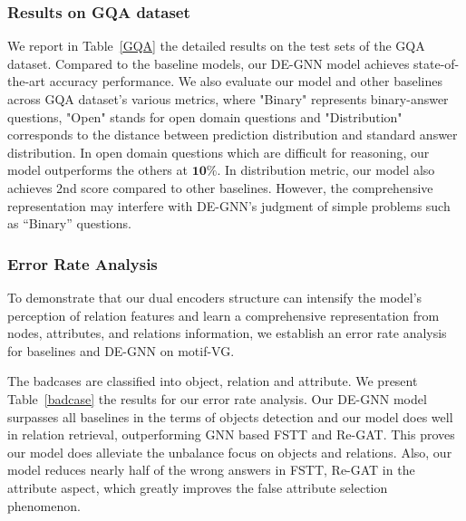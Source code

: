\documentclass[letterpaper]{article} %
\begin{document}
\subsubsection{Results on GQA dataset} We report in Table~\ref{GQA} the detailed results on the test sets of the GQA dataset. Compared to the baseline models, our DE-GNN model achieves state-of-the-art accuracy performance. We also evaluate our model and other baselines across GQA dataset's various metrics, where "Binary" represents binary-answer questions, "Open" stands for open domain questions and "Distribution" corresponds to the distance between prediction distribution and standard answer distribution. In open domain questions which are difficult for reasoning, our model outperforms the others at $\textbf{10\%}$. In distribution metric, our model also achieves 2nd score compared to other baselines. However, the comprehensive representation may interfere with DE-GNN's judgment of simple problems such as ``Binary'' questions.

\subsubsection{Error Rate Analysis} To demonstrate that our dual encoders structure can intensify the model's perception of relation features and learn a comprehensive representation from nodes, attributes, and relations information, we establish an error rate analysis for baselines and DE-GNN on motif-VG.

The badcases are classified into object, relation and attribute. We present Table~\ref{badcase} the results for our error rate analysis. Our DE-GNN model surpasses all baselines in the terms of objects detection and our model does well in relation retrieval, outperforming GNN based FSTT and Re-GAT. This proves our model does alleviate the unbalance focus on objects and relations.
Also, our model reduces nearly half of the wrong answers in FSTT, Re-GAT in the attribute aspect, which greatly improves the false attribute selection phenomenon.
\end{document}
